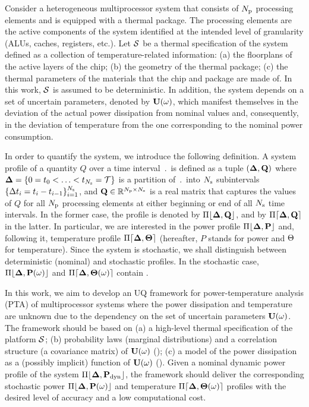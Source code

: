 
Consider a heterogeneous multiprocessor system that consists of ${N_\text{p}}$ processing elements and is equipped with a thermal package. The processing elements are the active components of the system identified at the intended level of granularity (ALUs, caches, registers, etc.). Let $\mathcal{S}$ be a thermal specification of the system defined as a collection of temperature-related information: (a) the floorplans of the active layers of the chip; (b) the geometry of the thermal package; (c) the thermal parameters of the materials that the chip and package are made of. In this work, $\mathcal{S}$ is assumed to be deterministic. In addition, the system depends on a set of uncertain parameters, denoted by $\mathbf{U}(\omega)$, which manifest themselves in the deviation of the actual power dissipation from nominal values and, consequently, in the deviation of temperature from the one corresponding to the nominal power consumption.

In order to quantify the system, we introduce the following definition. A system profile of a quantity $Q$ over a time interval $\period$ is defined as a tuple $(\part, \m{Q})$ where $\boldsymbol{\Delta} = \{ 0 = t_0 < \dotsc < t_{N_\text{s}} = \mathcal{T} \}$ is a partition of $\period$ into $N_\text{s}$ subintervals $\{ \Delta t_i = t_i - t_{i - 1} \}_{i = 1}^{N_\text{s}}$, and $\m{Q} \in \real^{\cores \times \steps}$ is a real matrix that captures the values of $Q$ for all ${N_\text{p}}$ processing elements at either beginning or end of all $N_\text{s}$ time intervals. In the former case, the profile is denoted by $\profB{\m{Q}}$, and by $\profE{\m{Q}}$ in the latter. In particular, we are interested in the power profile $\profP$ and, following it, temperature profile $\profT$ (hereafter, $P$ stands for power and $\Theta$ for temperature). Since the system is stochastic, we shall distinguish between deterministic (nominal) and stochastic profiles. In the stochastic case, $\profP{\o}$ and $\profT{\o}$ contain \rvs.

In this work, we aim to develop an UQ framework for power-temperature analysis (PTA) of multiprocessor systems where the power dissipation and temperature are unknown due to the dependency on the set of uncertain parameters $\mathbf{U}(\omega)$. The framework should be based on (a) a high-level thermal specification of the platform $\mathcal{S}$; (b) probability laws (marginal distributions) and a correlation structure (a covariance matrix) of $\mathbf{U}(\omega)$ (); (c) a model of the power dissipation as a (possibly implicit) function of $\mathbf{U}(\omega)$ (). Given a nominal dynamic power profile of the system $\profPdyn$, the framework should deliver the corresponding stochastic power $\profP{\o}$ and temperature $\profT{\o}$ profiles with the desired level of accuracy and a low computational cost.
